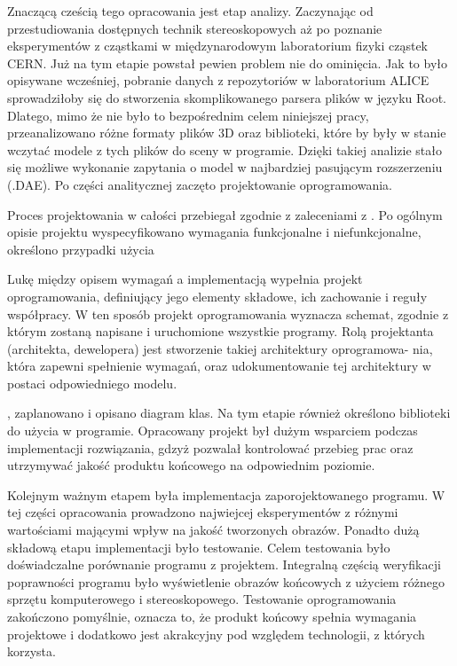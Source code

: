 Znaczącą cześcią tego opracowania jest etap analizy. Zaczynając od przestudiowania dostępnych technik stereoskopowych aż po poznanie eksperymentów z cząstkami w międzynarodowym laboratorium fizyki cząstek CERN. Już na tym etapie powstał pewien problem nie do ominięcia. Jak to było opisywane wcześniej, pobranie danych z repozytoriów w laboratorium ALICE sprowadziłoby się do stworzenia skomplikowanego parsera plików w języku Root. Dlatego, mimo że nie było to bezpośrednim celem niniejszej pracy, przeanalizowano różne formaty plików 3D oraz biblioteki, które by były w stanie wczytać modele z tych plików do sceny w programie. Dzięki takiej analizie stało się możliwe wykonanie zapytania o model w najbardziej pasującym rozszerzeniu (.DAE). Po części analitycznej zaczęto projektowanie oprogramowania.

Proces projektowania w całości przebiegał zgodnie z zaleceniami z \cite{specyfikacja}. Po ogólnym opisie projektu wyspecyfikowano wymagania funkcjonalne i niefunkcjonalne, określono przypadki użycia


Lukę między opisem wymagań a implementacją wypełnia projekt oprogramowania, definiujący jego elementy składowe, ich zachowanie i reguły współpracy. W ten sposób projekt oprogramowania wyznacza
schemat, zgodnie z którym zostaną napisane i uruchomione wszystkie programy. Rolą
projektanta (architekta, dewelopera) jest stworzenie takiej architektury oprogramowa-
nia, która zapewni spełnienie wymagań, oraz udokumentowanie tej architektury
w postaci odpowiedniego modelu.


, zaplanowano i opisano diagram klas. Na tym etapie również określono biblioteki do użycia w programie. Opracowany projekt był dużym wsparciem podczas implementacji rozwiązania, gdzyż pozwalał kontrolować przebieg prac oraz utrzymywać jakość produktu końcowego na odpowiednim poziomie.

Kolejnym ważnym etapem była implementacja zaporojektowanego programu. W tej części opracowania prowadzono najwiejcej eksperymentów z różnymi wartościami mającymi wpływ na jakość tworzonych obrazów. Ponadto dużą składową etapu implementacji było testowanie. Celem testowania było doświadczalne porównanie programu z projektem. Integralną częścią weryfikacji poprawności programu było wyświetlenie obrazów końcowych z użyciem różnego sprzętu komputerowego i stereoskopowego. Testowanie oprogramowania zakończono pomyślnie, oznacza to, że produkt końcowy spełnia wymagania projektowe i dodatkowo jest akrakcyjny pod względem technologii, z których korzysta.

